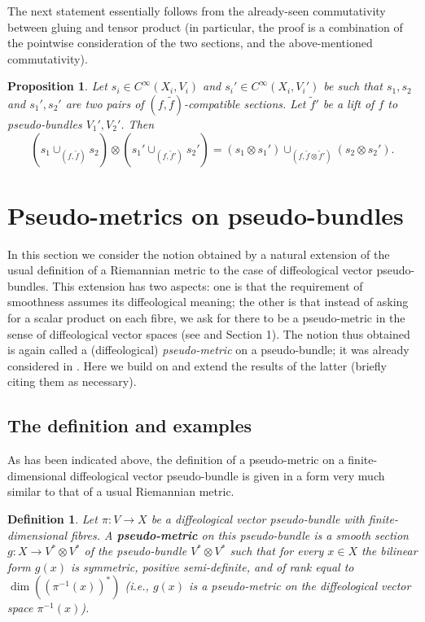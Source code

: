 \documentclass{article}
\newtheorem{prop}[lemma]{Proposition}
\newtheorem{defn}[lemma]{Definition}
\begin{document}
The next statement essentially follows from the already-seen commutativity between gluing and tensor product (in particular, the proof is a combination of the pointwise consideration of the two sections, 
and the above-mentioned commutativity).

\begin{prop}
Let $s_i\in C^{\infty}(X_i,V_i)$ and $s_i'\in C^{\infty}(X_i,V_i')$ be such that $s_1,s_2$ and $s_1',s_2'$ are two pairs of $(f,\tilde{f})$-compatible sections. Let $\tilde{f}'$ be a lift of
$f$ to pseudo-bundles $V_1',V_2'$. Then
$$(s_1\cup_{(f,\tilde{f})}s_2)\otimes(s_1'\cup_{(f,\tilde{f}')}s_2')=(s_1\otimes s_1')\cup_{(f,\tilde{f}\otimes\tilde{f}')}(s_2\otimes s_2').$$
\end{prop}



\section{Pseudo-metrics on pseudo-bundles}

In this section we consider the notion obtained by a natural extension of the usual definition of a Riemannian metric to the case of diffeological vector pseudo-bundles. This extension has two aspects: one is 
that the requirement of smoothness assumes its diffeological meaning; the other is that instead of asking for a scalar product on each fibre, we ask for there to be a pseudo-metric in the sense of diffeological 
vector spaces (see \cite{pseudometric} and Section 1). The notion thus obtained is again called a (diffeological) \emph{pseudo-metric} on a pseudo-bundle; it was already considered in \cite{pseudobundles}. 
Here we build on and extend the results of the latter (briefly citing them as necessary).


\subsection{The definition and examples}

As has been indicated above, the definition of a pseudo-metric on a finite-dimensional diffeological vector pseudo-bundle is given in a form very much similar to that of a usual Riemannian metric.

\begin{defn}
Let $\pi:V\to X$ be a diffeological vector pseudo-bundle with finite-dimensional fibres. A \textbf{pseudo-metric} on this pseudo-bundle is a smooth section $g:X\to V^*\otimes V^*$ of the pseudo-bundle 
$V^*\otimes V^*$ such that for every $x\in X$ the bilinear form $g(x)$ is symmetric, positive semi-definite, and of rank equal to $\dim((\pi^{-1}(x))^*)$ (\emph{i.e.}, $g(x)$ is a pseudo-metric on the diffeological 
vector space $\pi^{-1}(x)$).
\end{defn}
\end{document}
